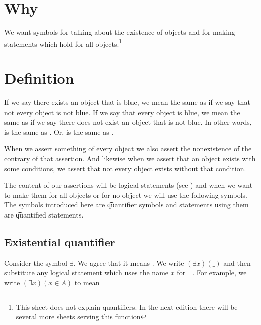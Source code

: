 

\section*{Why}

We want symbols for talking about the existence of objects and for making statements which hold for all objects.\footnote{This sheet does not explain quantifiers. In the next edition there will be several more sheets serving this function}

\section*{Definition}

If we say there exists an object that is blue, we mean the same as if we say that not every object is not blue.
If we say that every object is blue, we mean the same as if we say there does not exist an object that is not blue.
In other words,  is the same as .
Or,  is the same as .

When we assert something of every object we also assert the nonexistence of the contrary of that assertion.
And likewise when we assert that an object exists with some conditions, we assert that not every object exists without that condition.

The content of our assertions will be logical statements (see ) and when we want to make them for all objects or for no object we will use the following symbols.
The symbols introduced here are \t{quantifier symbols} and statements using them are \t{quantified statements}.

\subsection*{Existential quantifier}

Consider the symbol $\exists $.
We agree that it means .
We write $(\exists x)(\_)$ and then substitute any logical statement which uses the name $x$ for $\_$ .
For example, we write $(\exists x)(x \in A)$ to mean 
%  

